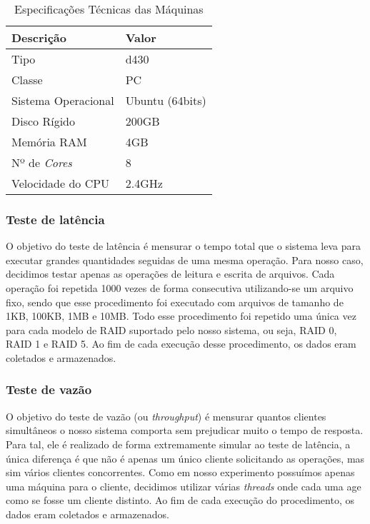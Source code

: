 	\capstartfalse
	\begin{table} [htb]
		\caption{Especificações Técnicas das Máquinas}
		\centering
		\begin{tabular}{|l|l|} \hline
			\textbf{Descrição} 	& \textbf{Valor} \\ \hline
			
			Tipo				& d430\\ \hline
			Classe				& PC\\ \hline
			Sistema Operacional & Ubuntu (64bits)\\ \hline
			Disco Rígido		& 200GB \\ \hline
			Memória RAM			& 4GB \\ \hline
			Nº de \textit{Cores}& 8 \\ \hline
			Velocidade do CPU	& 2.4GHz  \\ \hline
						
		\end{tabular}
		\label{tab:exp_vm}
	\end{table}
	\capstarttrue
	

	\subsubsection{Teste de latência}
	O objetivo do teste de latência é mensurar o tempo total que o sistema leva para executar grandes quantidades seguidas de uma mesma operação. Para nosso caso, decidimos testar apenas as operações de leitura e escrita de arquivos. Cada operação foi repetida 1000 vezes de forma consecutiva utilizando-se um arquivo fixo, sendo que esse procedimento foi executado com arquivos de tamanho de 1KB, 100KB, 1MB e 10MB. Todo esse procedimento foi repetido uma única vez para cada modelo de RAID suportado pelo nosso sistema, ou seja, RAID 0, RAID 1 e RAID 5. Ao fim de cada execução desse procedimento, os dados eram coletados e armazenados.
	\\
	
	\subsubsection{Teste de vazão}	
	O objetivo do teste de vazão (ou \textit{throughput}) é mensurar quantos clientes simultâneos o nosso sistema comporta sem prejudicar muito o tempo de resposta. Para tal, ele é realizado de forma extremamente simular ao teste de latência, a única diferença é que não é apenas um único cliente solicitando as operações, mas sim vários clientes concorrentes. Como em nosso experimento possuímos apenas uma máquina para o cliente, decidimos utilizar várias \textit{threads} onde cada uma age como se fosse um cliente distinto. Ao fim de cada execução do procedimento, os dados eram coletados e armazenados.
	\\
	
